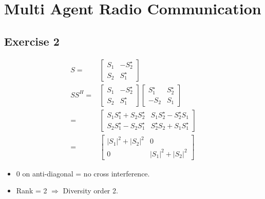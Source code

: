 \section{Multi Agent Radio Communication}

\subsection{Exercise 2}

\begin{align*}
   S = &
    \begin{bmatrix}
      S_1 & -S_2^{\star} \\[0.3em]
      S_2 & S_1^{\star} 
    \end{bmatrix} \\
    SS^H = & 
    \begin{bmatrix}
      S_1 & -S_2^{\star} \\[0.3em]
      S_2 & S_1^{\star}
    \end{bmatrix}
            \begin{bmatrix}
              S_1^{\star} & S_2^{\star} \\[0.3em]
              -S_2 & S_1
            \end{bmatrix} \\
           = & 
            \begin{bmatrix}
              S_1S_1^{\star}+S_2S_2^{\star} & S_1S_2^{\star}-S_2^{\star}S_1 \\[0.3em]
              S_2S_1^{\star}-S_2S_1^{\star} & S_2^{\star}S_2+S_1S_1^{\star}
            \end{bmatrix} \\
            = &
            \begin{bmatrix}
              |S_1|^2+|S_2|^2 & 0 \\[0.3em] 
              0              & |S_1|^2+|S_2|^2
            \end{bmatrix}
\end{align*}

\begin{itemize}
\item 0 on anti-diagonal = no cross interference.
\item Rank = 2 $\Rightarrow$ Diversity order 2.
\end{itemize}